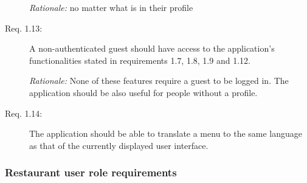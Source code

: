 \begin{description}
    \emph{Rationale:} no matter what is in their profile
    \item [Req. 1.13:] A non-authenticated guest should have access to the application's functionalities stated in requirements 1.7, 1.8, 1.9 and 1.12. 
    
    \emph{Rationale:} None of these features require a guest to be logged in. The application should be also useful for people without a profile.
    \item [Req. 1.14:] The application should be able to translate a menu to the same language as that of the currently displayed user interface.
\end{description}

\subsubsection{Restaurant user role requirements}
